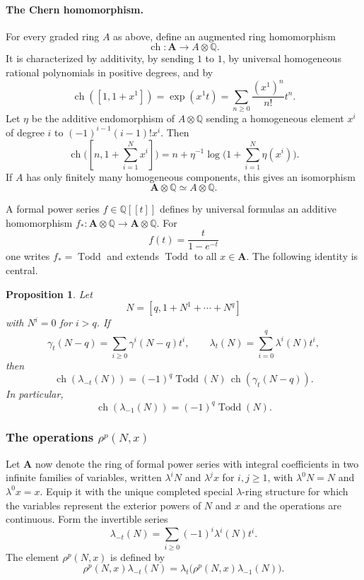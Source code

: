 \documentclass[14pt]{extarticle}
\newcommand{\QQ}{\mathbb Q}
\newcommand{\ch}{\operatorname{ch}}
\newcommand{\Todd}{\operatorname{Todd}}
\newtheorem*{proposition*}{Proposition}
\begin{document}
\paragraph{The Chern homomorphism.}
For every graded ring $A$ as above, define an augmented ring homomorphism
\begin{equation}\label{eq:chernhom}
   \ch:\mathbf A\to A\otimes\QQ.
\end{equation}
It is characterized by additivity, by sending $1$ to $1$, by universal homogeneous rational polynomials in positive degrees, and by
\begin{equation}\label{eq:chlinear}
   \ch([1,1+x^1])=\exp(x^1t)=\sum_{n\geq0}\frac{(x^1)^n}{n!}t^n.
\end{equation}
Let $\eta$ be the additive endomorphism of $A\otimes\QQ$ sending a homogeneous element $x^i$ of degree $i$ to $(-1)^{i-1}(i-1)!x^i$. Then
\begin{equation}\label{eq:chexplicit}
   \ch\bigl([n,1+\sum_{i=1}^{N}x^i]\bigr)
   =n+\eta^{-1}\log\bigl(1+\sum_{i=1}^{N}\eta(x^i)\bigr).
\end{equation}
If $A$ has only finitely many homogeneous components, this gives an isomorphism
\[
   \mathbf A\otimes\QQ\simeq A\otimes\QQ.
\]

A formal power series $f\in\QQ[[t]]$ defines by universal formulas an additive homomorphism $f_*:\mathbf A\otimes\QQ\to\mathbf A\otimes\QQ$. For
\[
   f(t)=\frac{t}{1-e^{-t}}
\]
one writes $f_* = \Todd$ and extends $\Todd$ to all $x\in\mathbf A$. The following identity is central.

\begin{proposition*}
Let
\[
   N=[q,1+N^1+\cdots+N^q]
\]
with $N^i=0$ for $i>q$. If
\[
\gamma_t(N-q)=\sum_{i\geq0}\gamma^i(N-q)t^i,
\qquad
\lambda_t(N)=\sum_{i=0}^q\lambda^i(N)t^i,
\]
then
\begin{equation}\label{eq:toddgamma}
   \ch(\lambda_{-t}(N))=(-1)^q\Todd(N)\,\ch(\gamma_t(N-q)).
\end{equation}
In particular,
\begin{equation}\label{eq:toddminusone}
   \ch(\lambda_{-1}(N))=(-1)^q\Todd(N).
\end{equation}
\end{proposition*}

\subsubsection{The operations $\rho^p(N,x)$}

Let $\mathbf A$ now denote the ring of formal power series with integral coefficients in two infinite families of variables, written $\lambda^iN$ and $\lambda^jx$ for $i,j\geq1$, with $\lambda^0N=N$ and $\lambda^0x=x$. Equip it with the unique completed special $\lambda$-ring structure for which the variables represent the exterior powers of $N$ and $x$ and the operations are continuous. Form the invertible series
\[
   \lambda_{-t}(N)=\sum_{i\geq0}(-1)^i\lambda^i(N)t^i.
\]
The element $\rho^p(N,x)$ is defined by
\begin{equation}\label{eq:rho}
   \rho^p(N,x)\lambda_{-t}(N)
   =\lambda_t\bigl(\rho^p(N,x)\lambda_{-1}(N)\bigr).
\end{equation}
\end{document}

